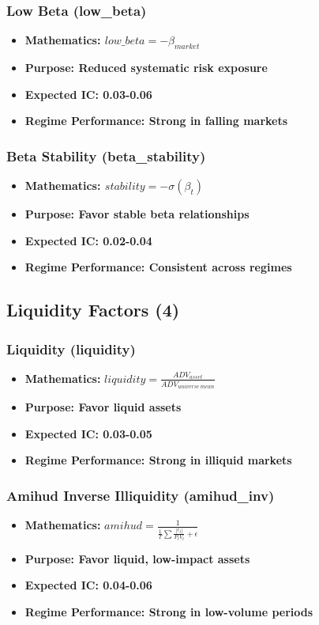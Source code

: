 \documentclass[11pt,letterpaper,openany]{book}
\begin{document}
\subsubsection{Low Beta (low\_beta)}
\begin{itemize}
    \item \textbf{Mathematics: $low\_beta = -\beta_{market}$}
    \item \textbf{Purpose: Reduced systematic risk exposure}
    \item \textbf{Expected IC: 0.03-0.06}
    \item \textbf{Regime Performance: Strong in falling markets}
\end{itemize}

\subsubsection{Beta Stability (beta\_stability)}
\begin{itemize}
    \item \textbf{Mathematics: $stability = -\sigma(\beta_t)$}
    \item \textbf{Purpose: Favor stable beta relationships}
    \item \textbf{Expected IC: 0.02-0.04}
    \item \textbf{Regime Performance: Consistent across regimes}
\end{itemize}

\subsection{Liquidity Factors (4)}

\subsubsection{Liquidity (liquidity)}
\begin{itemize}
    \item \textbf{Mathematics:} $liquidity = \frac{ADV_{asset}}{ADV_{universe\ mean}}$
    \item \textbf{Purpose: Favor liquid assets}
    \item \textbf{Expected IC: 0.03-0.05}
    \item \textbf{Regime Performance: Strong in illiquid markets}
\end{itemize}

\subsubsection{Amihud Inverse Illiquidity (amihud\_inv)}
\begin{itemize}
    \item \textbf{Mathematics:} $amihud = \frac{1}{\frac{1}{T}\sum\frac{|r_t|}{P_t V_t} + \epsilon}$
    \item \textbf{Purpose: Favor liquid, low-impact assets}
    \item \textbf{Expected IC: 0.04-0.06}
    \item \textbf{Regime Performance: Strong in low-volume periods}
\end{itemize}
\end{document}

